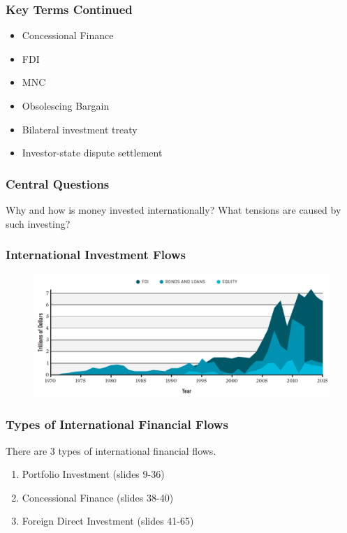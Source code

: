 \documentclass[handout]{beamer}
\begin{document}
\begin{frame} 
	\frametitle{\LARGE{Key Terms Continued}}
	\begin{itemize}
		\item Concessional Finance
		\item FDI
		\item MNC
		\item Obsolescing Bargain
		\item Bilateral investment treaty
		\item Investor-state dispute settlement
	\end{itemize}
\end{frame}

\begin{frame} 
\frametitle{\LARGE{Central Questions}}
    \centering
    \Large{Why and how is money invested internationally? What tensions are caused by such investing?}
\end{frame}

\begin{frame} 
\frametitle{\LARGE{International Investment Flows}}
\begin{figure}[ht!]
\centering
\includegraphics[width=\textwidth,height=0.8\textheight]{./invest.png}
\end{figure}
\end{frame}

\begin{frame} 
	\frametitle{\LARGE{Types of International Financial Flows}}
There are 3 types of international financial flows.
	\begin{enumerate}
		\item Portfolio Investment (slides 9-36)
		\item Concessional Finance (slides 38-40)
		\item Foreign Direct Investment	(slides 41-65)  
	\end{enumerate}

\end{frame}
\end{document}
